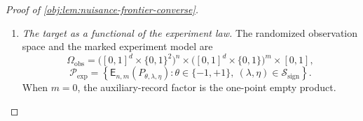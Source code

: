 \documentclass[11pt]{article}
\begin{document}
\begin{proof}[Proof of \cref{obj:lem:nuisance-frontier-converse}]
\begin{enumerate}
Define the mixtures of the original data blocks by
\[
M_\theta
=\int \mathcal L_P(\mathcal D_{n,m})\,d\varpi_\theta(P),
\qquad \theta\in\{-1,+1\}.
\]
The certificate also supplies
\[
H^2(M_{+1},M_{-1})\le CnNh^d\delta^da^2b^2.
\]
To evaluate its right-hand side, first note that
\[
\delta^da^2b^2=\rho_0^4\delta^{d+2S},
\qquad
d+\frac{\gamma(d+2S)}{S}
=d+\frac{\gamma d}{S}+2\gamma=\Delta.
\]
Hence
\[
\begin{aligned}
nNh^d\delta^da^2b^2
&=\rho_0^4c_h^dc_\delta^{d+2S}
  (nN)^{\,1-d/\Delta-\gamma(d+2S)/(S\Delta)}\\
&=\rho_0^4c_h^dc_\delta^{d+2S}.
\end{aligned}
\]
The inequality \(C\rho_0^4c_h^dc_\delta^{d+2S}\le1/16\) proves
\[
H^2(M_{+1},M_{-1})
\le C\rho_0^4c_h^dc_\delta^{d+2S}
\le\frac1{16}.
\]

\item \textit{The target as a functional of the experiment law.}
The randomized observation space and the marked experiment model are
\[
\Omega_{\mathrm{obs}}
=
\bigl([0,1]^d\times\{0,1\}^2\bigr)^n
\times
\bigl([0,1]^d\times\{0,1\}\bigr)^m
\times[0,1],
\]
\[
\mathcal P_{\mathrm{exp}}
=
\left\{
\mathsf E_{n,m}(P_{\theta,\lambda,\eta}):
\theta\in\{-1,+1\},\
(\lambda,\eta)\in\mathcal S_{\mathrm{sign}}
\right\}.
\]
When \(m=0\), the auxiliary-record factor is the one-point empty product.


\end{enumerate}
\end{proof}
\end{document}
